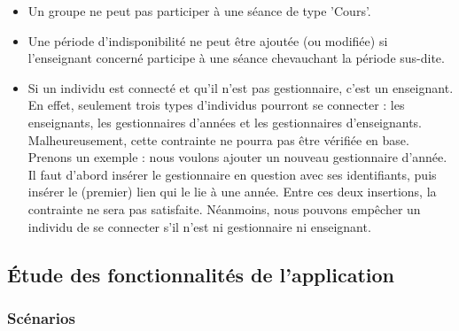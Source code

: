 \documentclass{article}
\begin{document}
\begin{itemize}
\item Un groupe ne peut pas participer à une séance de type 'Cours'.

\item Une période d'indisponibilité ne peut être ajoutée (ou modifiée) si l'enseignant concerné participe à une séance chevauchant la période sus-dite.

\item Si un individu est connecté et qu'il n'est pas gestionnaire, c'est un enseignant. En effet, seulement trois types d'individus pourront se connecter : les enseignants, les gestionnaires d'années et les gestionnaires d'enseignants. Malheureusement, cette contrainte ne pourra pas être vérifiée en base. Prenons un exemple : nous voulons ajouter un nouveau gestionnaire d'année. Il faut d'abord insérer le gestionnaire en question avec ses identifiants, puis insérer le (premier) lien qui le lie à une année. Entre ces deux insertions, la contrainte ne sera pas satisfaite. Néanmoins, nous pouvons empêcher un individu de se connecter s'il n'est ni gestionnaire ni enseignant.

\end{itemize}

\subsection{\'Etude des fonctionnalités de l'application}

\subsubsection{Scénarios}
\end{document}
